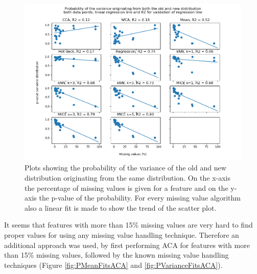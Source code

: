 \documentclass[10pt,a4paper]{report}
\begin{document}
	\begin{figure}[H]
		\centering
		\includegraphics[width=\textwidth]{Var_Dist.PNG}
		\caption{Plots showing the probability of the variance of the old and new distribution originating from the same distribution. On the x-axis the percentage of missing values is given for a feature and on the y-axis the p-value of the probability. For every missing value algorithm also a linear fit is made to show the trend of the scatter plot.}
		\label{fig:PVarianceFits}
	\end{figure}
	
	It seems that features with more than 15\% missing values are very hard to find proper values for using any missing value handling technique. Therefore an additional approach was used, by first performing ACA for features with more than 15\% missing values, followed by the known missing value handling techniques (Figure \ref{fig:PMeanFitsACA} and \ref{fig:PVarianceFitsACA}). 
	
\end{document}
